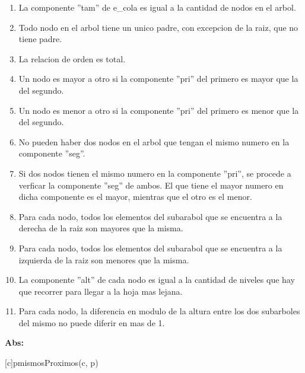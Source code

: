\begin{Representacion}
\begin{enumerate}
	\item{La componente ''tam'' de e\_cola es igual a la cantidad de nodos en el arbol.}
	\item{Todo nodo en el arbol tiene un unico padre, con excepcion de la raiz, que no tiene padre.}
	\item{La relacion de orden es total.}
	\item{Un nodo es mayor a otro si la componente ''pri'' del primero es mayor que la del segundo.}
	\item{Un nodo es menor a otro si la componente ''pri'' del primero es menor que la del segundo.}
	\item{No pueden haber dos nodos en el arbol que tengan el mismo numero en la componente ''seg''.}
	\item{Si dos nodos tienen el mismo numero en la componente ''pri'', se procede a verficar la 
	componente ''seg'' de ambos. El que tiene el mayor numero en dicha componente es el mayor, mientras
	que el otro es el menor.}
	\item{Para cada nodo, todos los elementos del subarabol que se encuentra a la derecha de la raiz
	son mayores que la misma.}
	\item{Para cada nodo, todos los elementos del subarabol que se encuentra a la izquierda de la raiz
	son menores que la misma.}
	\item{La componente ''alt'' de cada nodo es igual a la cantidad de niveles que hay que recorrer
	para llegar a la hoja mas lejana.}
	\item{Para cada nodo, la diferencia en modulo de la altura entre los dos subarboles del mismo no
	puede diferir en mas de 1.}
\end{enumerate}

\vspace{2em}


\textbf{Abs:}

\vspace{1em}

[c]{p}{mismosProximos(c, p)}

\vspace{1em}


\vspace{1em}

\vspace{1em}


\end{Representacion}
